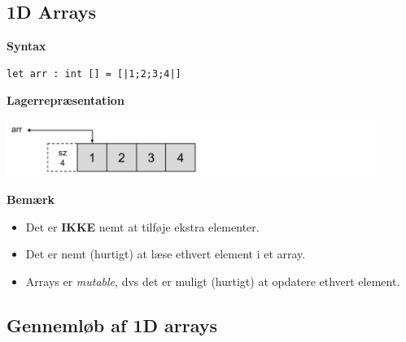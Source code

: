 \documentclass[rgb]{beamer}
\begin{document}
\popmaketitleframe

\subsection{1D Arrays}

\begin{frame}[fragile]


\textbf{Syntax}

\begin{lstlisting}[numbers=none,frame=none]
  let arr : int [] = [|1;2;3;4|]
\end{lstlisting}

\textbf{Lagerrepræsentation}

\includegraphics[width=0.9\textwidth]{array1234.png}

\textbf{Bemærk}

\begin{itemize}
  \item Det er \textbf{IKKE} nemt at tilføje ekstra elementer.
  \item Det er nemt (hurtigt) at læse ethvert element i et array.

  \item Arrays er \emph{mutable}, dvs det er muligt (hurtigt) at
    opdatere ethvert element.
  \end{itemize}
\end{frame}

\subsection{Gennemløb af 1D arrays}
\end{document}

